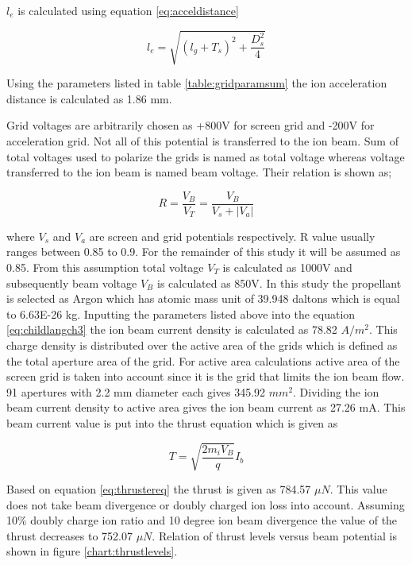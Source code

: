 $l_e$ is calculated using equation \ref{eq:acceldistance}

\begin{equation}
    l_e =  \sqrt{(l_g + T_s)^2 + \frac{D_{s}^2}{4}}
    \label{eq:acceldistance}
\end{equation}

Using the parameters listed in table \ref{table:gridparamsum} the ion acceleration distance is calculated as 1.86 mm.

Grid voltages are arbitrarily chosen as +800V for screen grid and -200V for acceleration grid. Not all of this potential is transferred to the ion beam. Sum of total voltages used to polarize the grids is named as total voltage whereas voltage transferred to the ion beam is named beam voltage. Their relation is shown as\cite{farnell2007performance};

\begin{equation}
    R = \frac{V_B}{V_T} = \frac{V_B}{V_s + |V_a|}
    \label{eq:Rvalue}
\end{equation}

where $V_s$ and $V_a$ are screen and grid potentials respectively. R value usually ranges between 0.85 to 0.9\cite{farnell2007performance}. For the remainder of this study it will be assumed as 0.85. From this assumption total voltage $V_T$ is calculated as 1000V and subsequently beam voltage $V_B$ is calculated as 850V. 
In this study the propellant is selected as Argon which has atomic mass unit of 39.948 daltons which is equal to 6.63E-26 kg. Inputting the parameters listed above into the equation \ref{eq:childlangch3} the ion beam current density is calculated as 78.82 $A/m^2$. This charge density is distributed over the active area of the grids which is defined as the total aperture area of the grid. For active area calculations active area of the screen grid is taken into account since it is the grid that limits the ion beam flow. 91 apertures with 2.2 mm diameter each gives 345.92 $mm^2$. Dividing the ion beam current density to active area gives the ion beam current as 27.26 mA. This beam current value is put into the thrust equation which is given as 

\begin{equation}
    T = \sqrt{\frac{2m_i V_B}{q}} I_b
    \label{eq:thrustereq}
\end{equation}

Based on equation \ref{eq:thrustereq} the thrust is given as 784.57 $\mu N$. This value does not take beam divergence or doubly charged ion loss into account. Assuming 10\% doubly charge ion ratio and 10 degree ion beam divergence the value of the thrust decreases to 752.07 $\mu N$. Relation of thrust levels versus beam potential is shown in figure \ref{chart:thrustlevels}.

